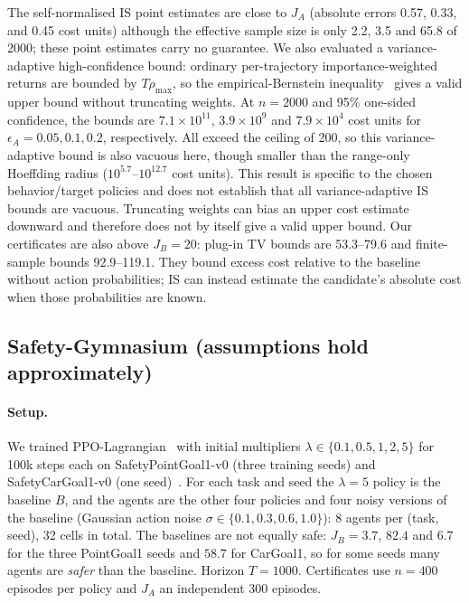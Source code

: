 \documentclass{article}
\begin{document}
The self-normalised IS point estimates are close to $J_A$ (absolute errors 0.57, 0.33, and 0.45 cost units) although the effective sample size is only 2.2, 3.5 and 65.8 of 2000; these point estimates carry no guarantee. We also evaluated a variance-adaptive high-confidence bound: ordinary per-trajectory importance-weighted returns are bounded by $T\rho_{\max}$, so the empirical-Bernstein inequality~\citep{maurer2009eb} gives a valid upper bound without truncating weights. At $n=2000$ and 95\% one-sided confidence, the bounds are $7.1\times10^{11}$, $3.9\times10^9$ and $7.9\times10^4$ cost units for $\epsilon_A=0.05,0.1,0.2$, respectively. All exceed the ceiling of 200, so this variance-adaptive bound is also vacuous here, though smaller than the range-only Hoeffding radius ($10^{5.7}$--$10^{12.7}$ cost units). This result is specific to the chosen behavior/target policies and does not establish that all variance-adaptive IS bounds are vacuous. Truncating weights can bias an upper cost estimate downward and therefore does not by itself give a valid upper bound. Our certificates are also above $J_B=20$: plug-in TV bounds are 53.3--79.6 and finite-sample bounds 92.9--119.1. They bound excess cost relative to the baseline without action probabilities; IS can instead estimate the candidate's absolute cost when those probabilities are known.

\subsection{Safety-Gymnasium (assumptions hold approximately)}

\paragraph{Setup.} We trained PPO-Lagrangian~\citep{ji2024omnisafe} with initial multipliers $\lambda\in\{0.1,0.5,1,2,5\}$ for 100k steps each on SafetyPointGoal1-v0 (three training seeds) and SafetyCarGoal1-v0 (one seed)~\citep{ji2023safetygym}. For each task and seed the $\lambda=5$ policy is the baseline $B$, and the agents are the other four policies and four noisy versions of the baseline (Gaussian action noise $\sigma\in\{0.1,0.3,0.6,1.0\}$): 8 agents per (task, seed), 32 cells in total. The baselines are not equally safe: $J_B=3.7$, $82.4$ and $6.7$ for the three PointGoal1 seeds and $58.7$ for CarGoal1, so for some seeds many agents are \emph{safer} than the baseline. Horizon $T=1000$. Certificates use $n=400$ episodes per policy and $J_A$ an independent 300 episodes.
\end{document}
